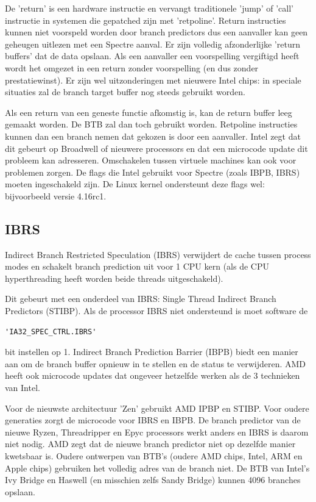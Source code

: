 De 'return' is een hardware instructie en vervangt traditionele 'jump' of 'call' instructie in systemen die gepatched zijn met 'retpoline'. Return instructies kunnen niet voorspeld worden door branch predictors dus een aanvaller kan geen geheugen uitlezen met een Spectre aanval.
Er zijn volledig afzonderlijke 'return buffers' dat de data opslaan. Als een aanvaller een voorspelling vergiftigd heeft wordt het omgezet in een return zonder voorspelling (en dus zonder prestatiewinst). Er zijn wel uitzonderingen met nieuwere Intel chips: in speciale situaties zal de branch target buffer nog steeds gebruikt worden.


Als een return van een geneste functie afkomstig is, kan de return buffer leeg gemaakt worden. De BTB zal dan toch gebruikt worden. Retpoline instructies kunnen dan een branch nemen dat gekozen is door een aanvaller. Intel zegt dat dit gebeurt op Broadwell of nieuwere processors en dat een microcode update dit probleem kan adresseren.
Omschakelen tussen virtuele machines kan ook voor problemen zorgen. De flags die Intel gebruikt voor Spectre (zoals IBPB, IBRS) moeten ingeschakeld zijn. De Linux kernel ondersteunt deze flags wel: bijvoorbeeld versie 4.16rc1.

\subsection{IBRS}


Indirect Branch Restricted Speculation (IBRS) verwijdert de cache tussen process modes en schakelt branch prediction uit voor 1 CPU kern (als de CPU hyperthreading heeft worden beide threads uitgeschakeld).

Dit gebeurt met een onderdeel van IBRS: Single Thread Indirect Branch Predictors (STIBP).
Als de processor IBRS niet ondersteund is moet software de \begin{verbatim}'IA32_SPEC_CTRL.IBRS'\end{verbatim}
bit instellen op 1.
Indirect Branch Prediction Barrier (IBPB) biedt een manier aan om de branch buffer opnieuw in te stellen en de status te verwijderen. AMD heeft ook microcode updates dat ongeveer hetzelfde werken als de 3 technieken van Intel.


Voor de nieuwste architectuur 'Zen' gebruikt AMD IPBP en STIBP. Voor oudere generaties zorgt de microcode voor IBRS en IBPB. De branch predictor van de nieuwe Ryzen, Threadripper en Epyc processors werkt anders en IBRS is daarom niet nodig. AMD zegt dat de nieuwe branch predictor niet op dezelfde manier kwetsbaar is. Oudere ontwerpen van BTB's (oudere AMD chips, Intel, ARM en Apple chips) gebruiken het volledig adres van de branch niet.
De BTB van Intel's Ivy Bridge en Haswell (en misschien zelfs Sandy Bridge) kunnen 4096 branches opslaan.\parencite{Godbolt2016}

